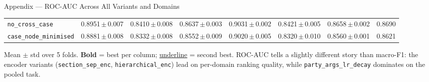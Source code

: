 \documentclass[aspectratio=169,11pt]{beamer}
\begin{document}
\begin{frame}{Appendix --- ROC-AUC Across All Variants and Domains}
\begin{adjustbox}{max width=\textwidth}
\begin{tabular}{lccccccc}
      \texttt{no\_cross\_case}                  & 0.8951\,$\pm$\,0.007 & 0.8410\,$\pm$\,0.008 & 0.8637\,$\pm$\,0.003 & 0.9031\,$\pm$\,0.002 & 0.8421\,$\pm$\,0.005 & 0.8658\,$\pm$\,0.002 & 0.8690 \\
      \texttt{case\_node\_minimised}            & 0.8881\,$\pm$\,0.008 & 0.8332\,$\pm$\,0.008 & 0.8552\,$\pm$\,0.009 & 0.9020\,$\pm$\,0.005 & 0.8320\,$\pm$\,0.010 & 0.8560\,$\pm$\,0.001 & 0.8621 \\
      \bottomrule
    \end{tabular}
  \end{adjustbox}

  \vspace{0.5em}
  \scriptsize Mean $\pm$ std over 5 folds. \textbf{Bold} = best per column; \underline{underline} = second best. ROC-AUC tells a slightly different story than macro-F1: the encoder variants (\texttt{section\_sep\_enc}, \texttt{hierarchical\_enc}) lead on per-domain ranking quality, while \texttt{party\_args\_lr\_decay} dominates on the pooled task.
\end{frame}
\end{document}
